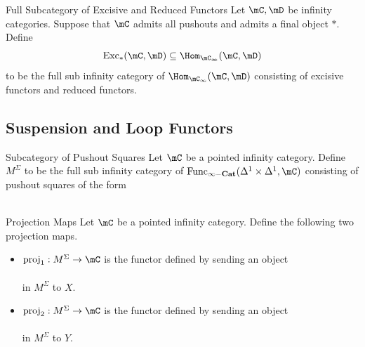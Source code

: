 \documentclass[a4paper]{article}
\begin{document}
\begin{defn}{Full Subcategory of Excisive and Reduced Functors}{} Let $\mC,\mD$ be infinity categories. Suppose that $\mC$ admits all pushouts and admits a final object $\ast$. Define $$\text{Exc}_\ast(\mC,\mD)\subseteq\Hom_{\mC_\infty}(\mC,\mD)$$ to be the full sub infinity category of $\Hom_{\mC_\infty}(\mC,\mD)$ consisting of excisive functors and reduced functors. 
\end{defn}

\subsection{Suspension and Loop Functors}
\begin{defn}{Subcategory of Pushout Squares}{} Let $\mC$ be a pointed infinity category. Define $M^\Sigma$ to be the full sub infinity category of $\text{Func}_\bold{\infty-\bold{Cat}}(\Delta^1\times\Delta^1,\mC)$ consisting of pushout squares of the form \\
\\
\end{defn}

\begin{defn}{Projection Maps}{} Let $\mC$ be a pointed infinity category. Define the following two projection maps. 
\begin{itemize}
\item $\text{proj}_1:M^\Sigma\to\mC$ is the functor defined by sending an object \\
\\
in $M^\Sigma$ to $X$. 
\item $\text{proj}_2:M^\Sigma\to\mC$ is the functor defined by sending an object \\
\\
in $M^\Sigma$ to $Y$. 
\end{itemize}
\end{defn}
\end{document}
